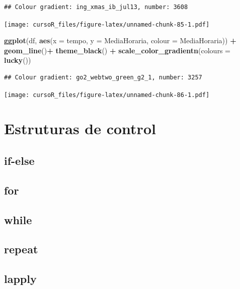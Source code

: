 \documentclass[]{book}
\newenvironment{Shaded}{\begin{snugshade}}{\end{snugshade}}
\newcommand{\KeywordTok}[1]{\textcolor[rgb]{0.13,0.29,0.53}{\textbf{#1}}}
\newcommand{\DataTypeTok}[1]{\textcolor[rgb]{0.13,0.29,0.53}{#1}}
\newcommand{\StringTok}[1]{\textcolor[rgb]{0.31,0.60,0.02}{#1}}
\newcommand{\OperatorTok}[1]{\textcolor[rgb]{0.81,0.36,0.00}{\textbf{#1}}}
\newcommand{\NormalTok}[1]{#1}
\begin{document}
\begin{verbatim}
## Colour gradient: ing_xmas_ib_jul13, number: 3608
\end{verbatim}

\texttt{[image: cursoR\_files/figure-latex/unnamed-chunk-85-1.pdf]}

\begin{Shaded}
\begin{Highlighting}[]
\KeywordTok{ggplot}\NormalTok{(df, }\KeywordTok{aes}\NormalTok{(}\DataTypeTok{x =}\NormalTok{ tempo, }\DataTypeTok{y =}\NormalTok{ MediaHoraria, }\DataTypeTok{colour =}\NormalTok{ MediaHoraria)) }\OperatorTok{+}\StringTok{ }
\StringTok{  }\KeywordTok{geom_line}\NormalTok{()}\OperatorTok{+}
\StringTok{  }\KeywordTok{theme_black}\NormalTok{() }\OperatorTok{+}
\StringTok{  }\KeywordTok{scale_color_gradientn}\NormalTok{(}\DataTypeTok{colours =} \KeywordTok{lucky}\NormalTok{())}
\end{Highlighting}
\end{Shaded}

\begin{verbatim}
## Colour gradient: go2_webtwo_green_g2_1, number: 3257
\end{verbatim}

\texttt{[image: cursoR\_files/figure-latex/unnamed-chunk-86-1.pdf]}

\chapter{Estruturas de control}\label{loop}

\section{if-else}\label{if-else}

\section{for}\label{for}

\section{while}\label{while}

\section{repeat}\label{repeat}

\section{lapply}\label{lapply}
\end{document}
